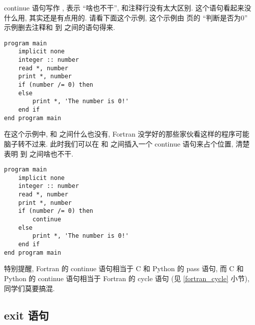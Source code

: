 continue 语句写作 , 表示 ``啥也不干'', 和注释行没有太大区别. 这个语句看起来没什么用, 其实还是有点用的. 请看下面这个示例, 这个示例由 \pageref{whether_zero} 页的 ``判断是否为0'' 示例删去注释和  到  之间的语句得来.
\begin{lstlisting}
program main
    implicit none
    integer :: number
    read *, number
    print *, number
    if (number /= 0) then
    else
        print *, 'The number is 0!'
    end if
end program main
\end{lstlisting}
在这个示例中,  和  之间什么也没有, Fortran 没学好的那些家伙看这样的程序可能脑子转不过来. 此时我们可以在  和  之间插入一个 continue 语句来占个位置, 清楚表明  到  之间啥也不干.
\begin{lstlisting}
program main
    implicit none
    integer :: number
    read *, number
    print *, number
    if (number /= 0) then
        continue
    else
        print *, 'The number is 0!'
    end if
end program main
\end{lstlisting}

特别提醒, Fortran 的 continue 语句相当于 C 和 Python 的 pass 语句, 而 C 和 Python 的 continue 语句相当于 Fortran 的 cycle 语句 (见 \ref{fortran_cycle} 小节), 同学们莫要搞混.

\subsection{exit 语句}\label{fortran_exit}

